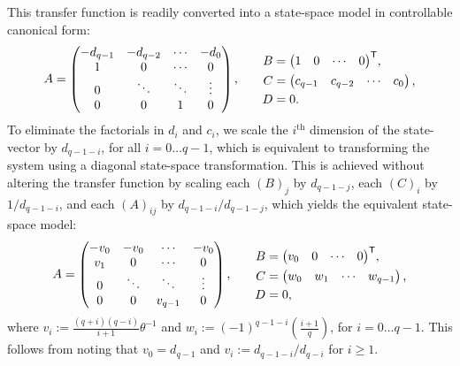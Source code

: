 This transfer function is readily converted into a state-space model in controllable canonical form:
\begin{equation*}
    \begin{alignedat}{2}
        A &= \begin{pmatrix} -d_{q-1} & -d_{q-2} & \cdots & -d_0 \\ 1 & 0 & \cdots & 0 \\ 0 & \ddots & \ddots & \vdots \\ 0 & 0 & 1 & 0\end{pmatrix} \text{,} & & \quad\quad \begin{alignedat}{1}
            B &= {\begin{pmatrix} 1 & 0 & \cdots & 0\end{pmatrix}}^\mathsf{T} \text{,} \\
            C &= \begin{pmatrix} c_{q-1} & c_{q-2} & \cdots & c_0\end{pmatrix} \text{,} \\
            D &= 0 \text{.}
        \end{alignedat}
    \end{alignedat}
\end{equation*}
To eliminate the factorials in $d_i$ and $c_i$, we scale the $i^{\text{th}}$ dimension of the state-vector by $d_{q-1-i}$, for all $i = 0 \ldots q - 1$, which is equivalent to transforming the system using a diagonal state-space transformation.
This is achieved without altering the transfer function by scaling each $(B)_j$ by $d_{q-1-j}$, each $(C)_i$ by $1 / d_{q-1-i}$, and each $(A)_{ij}$ by $d_{q-1-i} / d_{q-1-j}$, which yields the equivalent state-space model:
\begin{equation}
    \begin{alignedat}{2}
        A &= \begin{pmatrix} -v_0 & -v_0 & \cdots & -v_0 \\ v_1 & 0 & \cdots & 0 \\ 0 & \ddots & \ddots & \vdots \\ 0 & 0 & v_{q-1} & 0\end{pmatrix} \text{,} & & \quad\quad \begin{alignedat}{1}
            B &= {\begin{pmatrix} v_0 & 0 & \cdots & 0\end{pmatrix}}^\mathsf{T} \text{,} \\
            C &= \begin{pmatrix} w_0 & w_1 & \cdots & w_{q-1} \end{pmatrix} \text{,} \\
            D &= 0 \text{,} \label{eq:ss-delay}
        \end{alignedat}
    \end{alignedat}
\end{equation}
where $v_i := \frac{(q+i)(q-i)}{i+1} \theta^{-1}$ and $w_i := (-1)^{q - 1 - i} \left( \frac{i+1}{q} \right)$, for $i = 0 \ldots q-1$.
This follows from noting that $v_0 = d_{q-1}$ and $v_i := d_{q-1-i} / d_{q-i}$ for $i \ge 1$.

